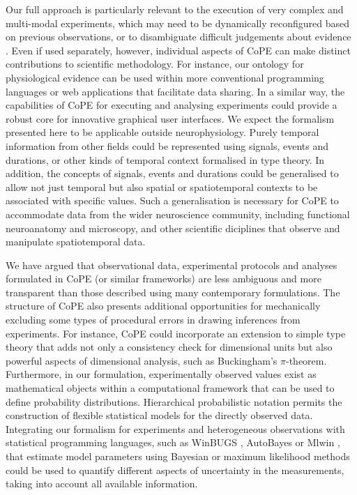 Our full approach is particularly relevant to the execution of very
complex and multi-modal experiments, which may need to be dynamically
reconfigured based on previous observations, or to disambiguate
difficult judgements about evidence \citep{Kriegeskorte2009}. Even if
used separately, however, individual aspects of CoPE can make distinct
contributions to scientific methodology. For instance, our ontology
for physiological evidence can be used within more conventional
programming languages or web applications that facilitate data
sharing. In a similar way, the capabilities of CoPE for executing and
analysing experiments could provide a robust core for innovative
graphical user interfaces. We expect the formalism presented here to
be applicable outside neurophysiology. Purely temporal information
from other fields could be represented using signals, events and
durations, or other kinds of temporal context formalised in type
theory. In addition, the concepts of signals, events and durations
could be generalised to allow not just temporal but also spatial or
spatiotemporal contexts to be associated with specific values. Such a
generalisation is necessary for CoPE to accommodate data from the
wider neuroscience community, including functional neuroanatomy and
microscopy, and other scientific diciplines that observe and
manipulate spatiotemporal data.

We have argued that observational data, experimental protocols and
analyses formulated in CoPE (or similar frameworks) are less ambiguous
and more transparent than those described using many contemporary
formulations. The structure of CoPE also presents additional
opportunities for mechanically excluding some types of procedural
errors in drawing inferences from experiments. For instance, CoPE
could incorporate an extension to simple type theory
\citep{Kennedy1997} that adds not only a consistency check for
dimensional units but also powerful aspects of dimensional analysis,
such as Buckingham's $\pi$-theorem. Furthermore, in our formulation,
experimentally observed values exist as mathematical objects within a
computational framework that can be used to define probability
distributions. Hierarchical probabilistic notation \citep{Gelman2006}
permits the construction of flexible statistical models for the
directly observed data. Integrating our formalism for experiments and
heterogeneous observations with statistical programming languages,
such as WinBUGS \citep{Gilks1994}, AutoBayes \citep{AutoBayes} or
Mlwin \citep{mlwin}, that estimate model parameters using Bayesian or
maximum likelihood methods could be used to quantify different aspects
of uncertainty in the measurements, taking into account all available
information.

